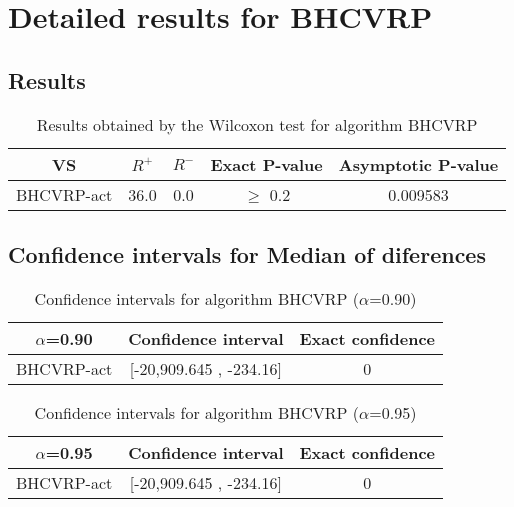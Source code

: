 \documentclass[a4paper,10pt]{article}
\begin{document}
 \clearpage 


\section{Detailed results for BHCVRP}


\subsection{Results}

\begin{table}[!htp]
\centering\small
\begin{tabular}{
|c|c|c|c|c|}
\hline
 VS & $R^{+}$ & $R^{-}$ & Exact P-value & Asymptotic P-value \\ \hline 
BHCVRP-act & 36.0 & 0.0 & $\geq$ 0.2 & 0.009583\\ \hline 

\end{tabular}
\caption{Results obtained by the Wilcoxon test for algorithm BHCVRP}
\end{table}

\subsection{Confidence intervals for Median of diferences}

\begin{table}[!htp]
\centering\small
\begin{tabular}{
|c|c|c|}
\hline
 $\alpha$=0.90 & Confidence interval & Exact confidence \\ \hline 
BHCVRP-act & [-20,909.645 , -234.16] & 0\\ \hline 

\end{tabular}
\caption{Confidence intervals for algorithm BHCVRP ($\alpha$=0.90)}
\end{table}
\begin{table}[!htp]
\centering\small
\begin{tabular}{
|c|c|c|}
\hline
 $\alpha$=0.95 & Confidence interval & Exact confidence \\ \hline 
BHCVRP-act & [-20,909.645 , -234.16] & 0\\ \hline 

\end{tabular}
\caption{Confidence intervals for algorithm BHCVRP ($\alpha$=0.95)}
\end{table}

 \clearpage 
\end{document}
